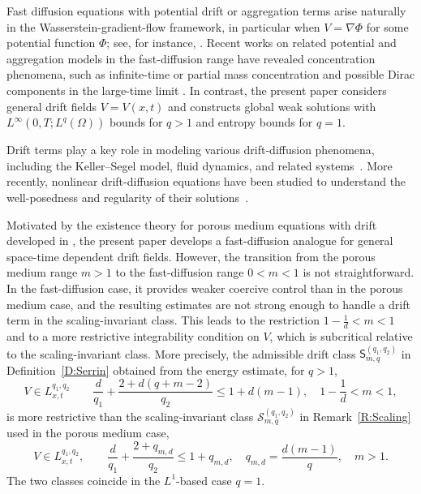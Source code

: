 \documentclass{amsart}
\numberwithin{equation}{section}
\begin{document}
Fast diffusion equations with potential drift or aggregation terms arise naturally in the Wasserstein-gradient-flow framework, in particular when $V=\nabla\Phi$ for some potential function $\Phi$; see, for instance, \cite{Santambrosio15}. Recent works on related potential and aggregation models in the fast-diffusion range have revealed concentration phenomena, such as infinite-time or partial mass concentration and possible Dirac components in the large-time limit \cite{CarGVaz2022, CarDFL2022, CarGG2024}. In contrast, the present paper considers general drift fields $V=V(x,t)$ and constructs global weak solutions with $L^\infty(0,T;L^q(\Omega))$ bounds for $q>1$ and entropy bounds for $q=1$.

Drift terms play a key role in modeling various drift-diffusion phenomena, including the Keller--Segel model, fluid dynamics, and related systems~\cite{SSSZ, Freitag, W18, Z11}. More recently, nonlinear drift-diffusion equations have been studied to understand the well-posedness and regularity of their solutions~\cite{KZ18, HZ21, CCY2019}. 

Motivated by the existence theory for porous medium equations with drift developed in \cite{HKK01,HKK02}, the present paper develops a fast-diffusion analogue for general space-time dependent drift fields. However, the transition from the porous medium range $m>1$ to the fast-diffusion range $0<m<1$ is not straightforward.
In the fast-diffusion case, it provides weaker coercive control than in the porous medium case, and the resulting estimates are not strong enough to handle a drift term in the scaling-invariant class. This leads to the restriction \(1-\frac{1}{d}<m<1\) and to a more restrictive integrability condition on \(V\), which is subcritical relative to the scaling-invariant class. More precisely, the admissible drift class \(\mathsf{S}_{m,q}^{(q_1,q_2)}\) in Definition~\ref{D:Serrin} obtained from the energy estimate, for \(q>1\),
\[
V \in L_{x,t}^{q_1, q_2}\qquad
\frac{d}{q_1} + \frac{2 + d(q+m-2)}{q_2} \leq 1 + d(m-1),
\quad 1-\frac{1}{d}<m<1,
\]
is more restrictive than the scaling-invariant class $\mathcal{S}_{m,q}^{(q_1,q_2)}$ in Remark~\ref{R:Scaling} used in the porous medium case,
\[
V \in L_{x,t}^{q_1, q_2}, \qquad
\frac{d}{q_1} + \frac{2 + q_{m,d}}{q_2} \leq 1 + q_{m,d},
\quad q_{m,d}=\frac{d(m-1)}{q},
\quad  m>1.
\]
The two classes coincide in the \(L^1\)-based case \(q=1\). 
\end{document}
